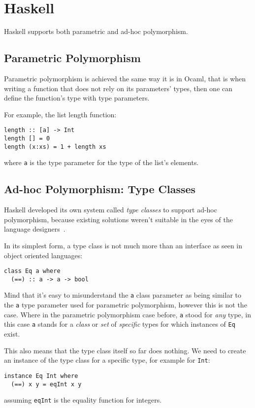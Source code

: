 \section{Haskell}

Haskell supports both parametric and ad-hoc polymorphism.

\subsection{Parametric Polymorphism}

Parametric polymorphism is achieved the same way it is in Ocaml, that is when writing a function that does not rely on its parameters' types, then one can define the function's type with type parameters.

For example, the list length function:
\begin{verbatim}
length :: [a] -> Int
length [] = 0
length (x:xs) = 1 + length xs
\end{verbatim}
where \verb|a| is the type parameter for the type of the list's elements.

\subsection{Ad-hoc Polymorphism: Type Classes}

Haskell developed its own system called \textit{type classes} to support ad-hoc polymorphism, because existing solutions weren't suitable in the eyes of the language designers~\cite{type-classes-original}.

In its simplest form, a type class is not much more than an interface as seen in object oriented languages:
\begin{verbatim}
class Eq a where
  (==) :: a -> a -> bool
\end{verbatim}
Mind that it's easy to misunderstand the \verb|a| class parameter as being similar to the \verb|a| type parameter used for parametric polymorphism, however this is not the case. Where in the parametric polymorphism case before, \verb|a| stood for \textit{any} type, in this case \verb|a| stands for a \textit{class} or \textit{set} of \textit{specific} types for which instances of \verb|Eq| exist.

This also means that the type class itself so far does nothing. We need to create an instance of the type class for a specific type, for example for \verb|Int|:
\begin{verbatim}
instance Eq Int where
  (==) x y = eqInt x y
\end{verbatim}
assuming \verb|eqInt| is the equality function for integers.

